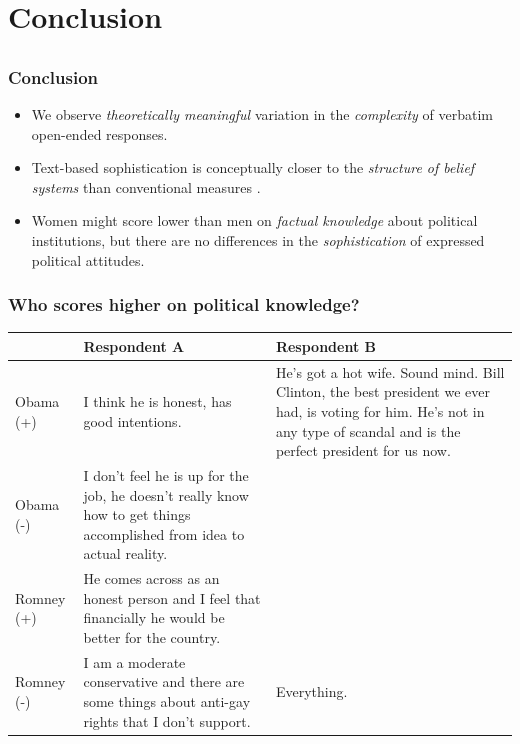 \documentclass{beamer}
\begin{document}

\section{Conclusion}
\subsection{}
\begin{frame}%
  \frametitle{Conclusion}
  \begin{itemize}
\item We observe \emph{theoretically meaningful} variation in the \emph{complexity} of verbatim open-ended responses.
\item Text-based sophistication is conceptually closer to the \emph{structure of belief systems} than conventional measures \citep[e.g.,][]{tetlock1983cognitive,luskin1987measuring}.

\hspace{1em}
\item Women might score lower than men on \emph{factual knowledge} about political institutions, but there are no differences in the \emph{sophistication} of expressed political attitudes.
\end{itemize}
\end{frame}

\begin{frame}%
\frametitle{Who scores higher on political knowledge?}
\begin{table}[ht]\footnotesize\centering
\begin{tabular}{l|p{4.5cm}|p{4.5cm}}
   \toprule
    & \textbf{Respondent A} & \textbf{Respondent B} \\ 
    \midrule
  Obama (+) & I think he is honest, has good intentions. & He's got a hot wife. Sound mind. Bill Clinton, the best president we ever had, is voting for him. He's not in any type of scandal and is the perfect president for us now. \\ \hdashline
  Obama (-) & I don't feel he is up for the job, he doesn't really know how to get things accomplished from idea to actual reality. &  \\ \hdashline
  Romney (+) & He comes across as an honest person and I feel that financially he would be better for the country. &  \\ \hdashline
  Romney (-) & I am a moderate conservative and there are some things about anti-gay rights that I don't support. & Everything. \\
    \bottomrule
 \end{tabular}
\end{table}
\end{frame}
\end{document}
